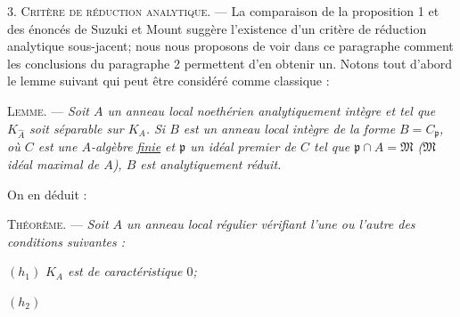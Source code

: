3. \textsc{Critère de réduction analytique.} --- La comparaison de la proposition 1 et des énoncés de Suzuki et Mount suggère l'existence d'un critère de réduction analytique sous-jacent; nous nous proposons de voir dans ce paragraphe comment les conclusions du paragraphe 2 permettent d'en obtenir un. Notons tout d'abord le lemme suivant qui peut être considéré comme classique :

\textsc{Lemme.} --- \textit{Soit $A$ un anneau local noethérien analytiquement intègre et tel que $K_{\widehat A}$ soit séparable sur $K_A$. Si $B$ est un anneau local intègre de la forme $B=C_{\mathfrak p}$, où $C$ est une $A$-algèbre \uline{finie} et $\mathfrak p$ un idéal premier de $C$ tel que $\mathfrak p\cap A=\mathfrak M$ ($\mathfrak M$ idéal maximal de $A$), $B$ est analytiquement réduit.}

On en déduit :

\textsc{Théorème.} --- \textit{Soit $A$ un anneau local régulier vérifiant l'une ou l'autre des conditions suivantes :}

$(h_1)$ \textit{$K_A$ est de caractéristique $0$;}

$(h_2)$ 

